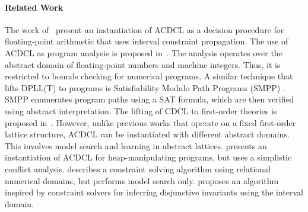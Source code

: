 \paragraph{Related Work}
The work of~\cite{sas13,DBLP:journals/fmsd/BrainDGHK14} present an
instantiation of ACDCL as a decision procedure for floating-point
arithmetic that uses interval constraint propagation.  
%
The use of
ACDCL as program analysis is proposed in~\cite{tacas12}.  The analysis
operates over the abstract domain of floating-point numbers and
machine integers.  Thus, it is restricted to bounds checking for
numerical programs.  
%
A similar technique that lifts DPLL(T) to
programs is Satisfiability Modulo Path Programs (SMPP) \cite{SMPP}. SMPP
enumerates program paths using a SAT formula, which are then verified
using abstract interpretation.  
%
The lifting of CDCL to first-order theories is proposed
in~\cite{dpll,cp09,ndsmt}.
%
 However, unlike
previous works that operate on a fixed first-order lattice structure,
ACDCL can be instantiated with different abstract domains.  This
involves model search and learning in abstract lattices.   
%
\cite{DBLP:journals/fmsd/BrainDGHK14} presents an instantiation of ACDCL for
heap-manipulating programs, but uses a simplistic conflict analysis.
%
\cite{DBLP:conf/vmcai/PelleauMTB13} describes a constraint solving algorithm
using relational numerical domains, but performs model search only.
%
\cite{DBLP:conf/esop/MineBR16} proposes an algorithm inspired by constraint
solvers for inferring disjunctive invariants using the interval domain.
%

